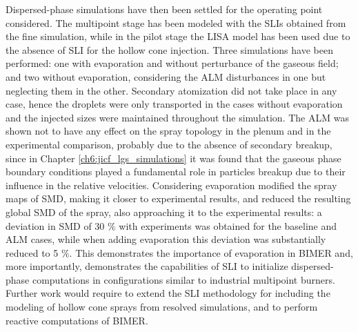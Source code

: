 Dispersed-phase simulations have then been settled for the operating point considered. The multipoint stage has been modeled with the SLIs obtained from the fine simulation, while in the pilot stage the LISA model has been used due to the absence of SLI for the hollow cone injection. Three simulations have been performed: one with evaporation and without perturbance of the gaseous field; and two without evaporation, considering the ALM disturbances in one but neglecting them in the other. Secondary atomization did not take place in any case, hence the droplets were only transported in the cases without evaporation and the injected sizes were maintained throughout the simulation. The ALM was shown not to have any effect on the spray topology in the plenum and in the experimental comparison, probably due to the absence of secondary breakup, since in Chapter \ref{ch6:jicf_lgs_simulations} it was found that the gaseous phase boundary conditions played a fundamental role in particles breakup due to their influence in the relative velocities. Considering evaporation modified the spray maps of SMD, making it closer to experimental results, and reduced the resulting global SMD of the spray, also approaching it to the experimental results: a deviation in SMD of 30 $\%$ with experiments was obtained for the baseline and ALM cases, while when adding evaporation this deviation was substantially reduced to 5 $\%$. This demonstrates the importance of evaporation in BIMER and, more importantly, demonstrates the capabilities of SLI to initialize dispersed-phase computations in configurations similar to industrial multipoint burners. Further work would require to extend the SLI methodology for including the modeling of hollow cone sprays from resolved simulations, and to perform reactive computations of BIMER.




